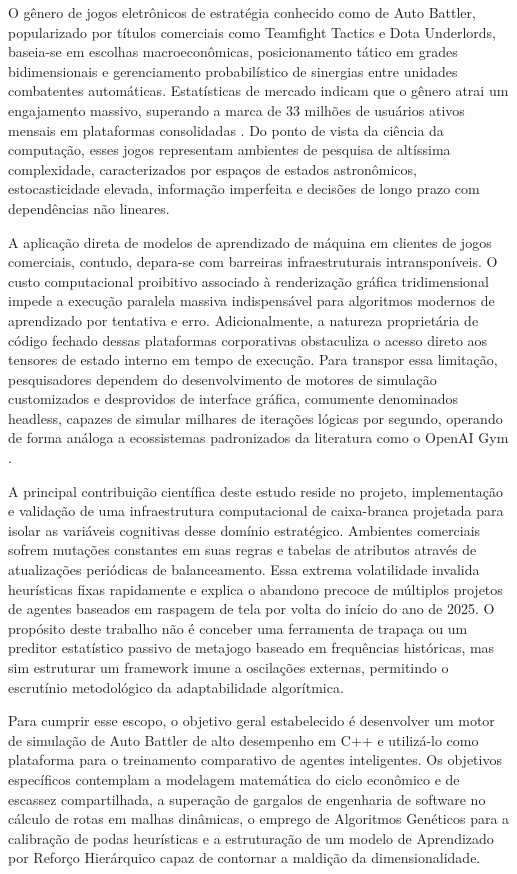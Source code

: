 \documentclass[12pt]{article}
\begin{document}
O gênero de jogos eletrônicos de estratégia conhecido como de Auto Battler, popularizado por títulos comerciais como Teamfight Tactics e Dota Underlords, baseia-se em escolhas macroeconômicas, posicionamento tático em grades bidimensionais e gerenciamento probabilístico de sinergias entre unidades combatentes automáticas. Estatísticas de mercado indicam que o gênero atrai um engajamento massivo, superando a marca de 33 milhões de usuários ativos mensais em plataformas consolidadas \cite{henkel2019}. Do ponto de vista da ciência da computação, esses jogos representam ambientes de pesquisa de altíssima complexidade, caracterizados por espaços de estados astronômicos, estocasticidade elevada, informação imperfeita e decisões de longo prazo com dependências não lineares.

A aplicação direta de modelos de aprendizado de máquina em clientes de jogos comerciais, contudo, depara-se com barreiras infraestruturais intransponíveis. O custo computacional proibitivo associado à renderização gráfica tridimensional impede a execução paralela massiva indispensável para algoritmos modernos de aprendizado por tentativa e erro. Adicionalmente, a natureza proprietária de código fechado dessas plataformas corporativas obstaculiza o acesso direto aos tensores de estado interno em tempo de execução. Para transpor essa limitação, pesquisadores dependem do desenvolvimento de motores de simulação customizados e desprovidos de interface gráfica, comumente denominados headless, capazes de simular milhares de iterações lógicas por segundo, operando de forma análoga a ecossistemas padronizados da literatura como o OpenAI Gym \cite{brockman2016}.

A principal contribuição científica deste estudo reside no projeto, implementação e validação de uma infraestrutura computacional de caixa-branca projetada para isolar as variáveis cognitivas desse domínio estratégico. Ambientes comerciais sofrem mutações constantes em suas regras e tabelas de atributos através de atualizações periódicas de balanceamento. Essa extrema volatilidade invalida heurísticas fixas rapidamente e explica o abandono precoce de múltiplos projetos de agentes baseados em raspagem de tela por volta do início do ano de 2025. O propósito deste trabalho não é conceber uma ferramenta de trapaça ou um preditor estatístico passivo de metajogo baseado em frequências históricas, mas sim estruturar um framework imune a oscilações externas, permitindo o escrutínio metodológico da adaptabilidade algorítmica.

Para cumprir esse escopo, o objetivo geral estabelecido é desenvolver um motor de simulação de Auto Battler de alto desempenho em C++ e utilizá-lo como plataforma para o treinamento comparativo de agentes inteligentes. Os objetivos específicos contemplam a modelagem matemática do ciclo econômico e de escassez compartilhada, a superação de gargalos de engenharia de software no cálculo de rotas em malhas dinâmicas, o emprego de Algoritmos Genéticos para a calibração de podas heurísticas e a estruturação de um modelo de Aprendizado por Reforço Hierárquico capaz de contornar a maldição da dimensionalidade.
\end{document}
